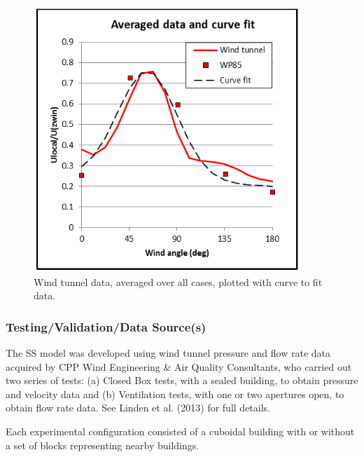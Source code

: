 \begin{figure}[hbtp] %
\centering
\includegraphics[width=0.9\textwidth, height=0.9\textheight, keepaspectratio=true]{media/ss-figure6.png}
\caption{Wind tunnel data, averaged over all cases, plotted with curve to fit data. \protect \label{fig:ss-pressure-network-two-openings}}
\end{figure}

\subsubsection{Testing/Validation/Data Source(s)}
The SS model was developed using wind tunnel pressure and flow rate data acquired by CPP Wind Engineering \& Air Quality Consultants, who carried out two series of tests: (a) Closed Box tests, with a sealed building, to obtain pressure and velocity data and (b) Ventilation tests, with one or two apertures open, to obtain flow rate data. See Linden et al. (2013) for full details.

Each experimental configuration consisted of a cuboidal building with or without a set of blocks representing nearby buildings. 

